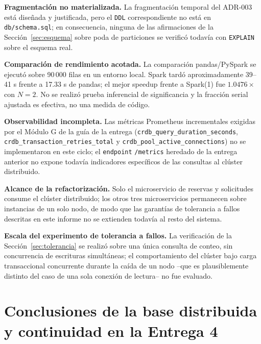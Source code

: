 \documentclass[10pt,twocolumn]{article}
\begin{document}
\textbf{Fragmentación no materializada.} La fragmentación temporal del
ADR-003 está diseñada y justificada, pero el \texttt{DDL} correspondiente
no está en \texttt{db/schema.sql}; en consecuencia, ninguna de las
afirmaciones de la Sección~\ref{sec:esquema} sobre poda de particiones se
verificó todavía con \texttt{EXPLAIN} sobre el esquema real.

\textbf{Comparación de rendimiento acotada.} La comparación pandas/PySpark
se ejecutó sobre 90\,000 filas en un entorno local. Spark tardó aproximadamente
39--41 s frente a 17.33 s de pandas; el mejor speedup frente a Spark(1) fue
$1.0476\times$ con $N=2$. No se realizó prueba inferencial de significancia y
la fracción serial ajustada es efectiva, no una medida de código.

\textbf{Observabilidad incompleta.} Las métricas Prometheus incrementales
exigidas por el Módulo G de la guía de la entrega
(\texttt{crdb\_query\_duration\_seconds},
\texttt{crdb\_transaction\_retries\_total} y
\texttt{crdb\_pool\_active\_connections}) no se implementaron en este
ciclo; el \texttt{endpoint} \texttt{/metrics} heredado de la entrega
anterior no expone todavía indicadores específicos de las consultas al
clúster distribuido.

\textbf{Alcance de la refactorización.} Solo el microservicio de
reservas y solicitudes consume el clúster distribuido; los otros tres
microservicios permanecen sobre instancias de un solo nodo, de modo que
las garantías de tolerancia a fallos descritas en este informe no se
extienden todavía al resto del sistema.

\textbf{Escala del experimento de tolerancia a fallos.} La verificación de
la Sección~\ref{sec:tolerancia} se realizó sobre una única consulta de
conteo, sin concurrencia de escrituras simultáneas; el comportamiento del
clúster bajo carga transaccional concurrente durante la caída de un nodo
--que es plausiblemente distinto del caso de una sola conexión de
lectura-- no fue evaluado.

\section{Conclusiones de la base distribuida y continuidad en la Entrega 4}
\label{sec:conclusiones}
\end{document}
